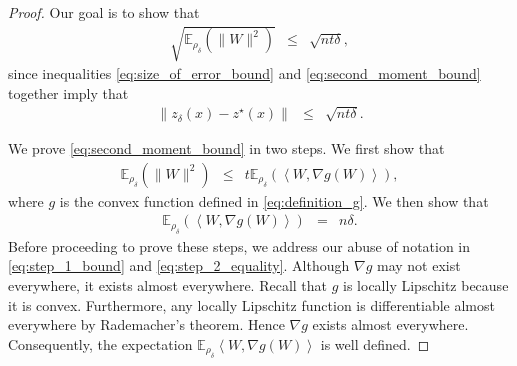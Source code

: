 \documentclass{article}
\newcommand{\E}{\mathbb{E}}
\theoremstyle{plain}
\theoremstyle{definition}
\theoremstyle{remark}
\begin{document}
\begin{proof}
Our goal is to show that
\begin{eqnarray}
\label{eq:second_moment_bound}
\sqrt{\E_{\rho_\delta}\left (\lVert W \rVert^2\right)} & \leq & \sqrt{nt \delta},
\end{eqnarray}
since inequalities \eqref{eq:size_of_error_bound} and \eqref{eq:second_moment_bound} together imply that
\begin{eqnarray}
\|z_\delta(x) - z^\star(x)\| & \leq & \sqrt{nt \delta}.
\end{eqnarray}

We prove \eqref{eq:second_moment_bound} in two steps. We first show that
\begin{eqnarray}
\label{eq:step_1_bound}
\E_{\rho_\delta}\left( \rVert W \rVert^2\right) & \leq & t\E_{\rho_\delta}\left(\left\langle W, \nabla g(W)\right\rangle \right),
\end{eqnarray}
where $g$ is the convex function defined in \eqref{eq:definition_g}.
We then show that
\begin{eqnarray}
\label{eq:step_2_equality}
\E_{\rho_\delta}\left(\left\langle W, \nabla g(W)\right\rangle \right) & = & n\delta.
\end{eqnarray}
Before proceeding to prove these steps, we address our abuse of notation in \eqref{eq:step_1_bound} and \eqref{eq:step_2_equality}. 
Although $\nabla g$ may not exist everywhere, it exists almost everywhere. 
Recall that $g$ is locally Lipschitz because it is convex. Furthermore, any locally Lipschitz function is differentiable almost everywhere by Rademacher's theorem. Hence $\nabla g$ exists almost everywhere. Consequently, the expectation $\E_{\rho_\delta}\left \langle W, \nabla g(W) \right\rangle$ is well defined.


\end{proof}
\end{document}
